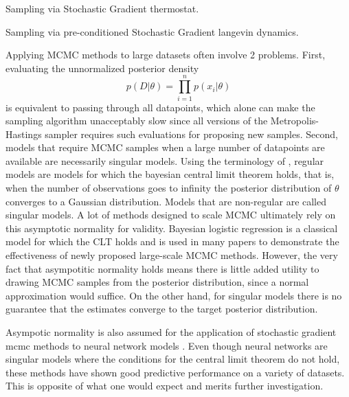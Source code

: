 \documentclass{book}
\begin{document}
\begin{enumerate}
Sampling via Stochastic Gradient thermostat. 

Sampling via pre-conditioned Stochastic Gradient langevin dynamics. 

Applying MCMC methods to large datasets often involve 2 problems. First, evaluating the unnormalized posterior density
\[ p(D|\theta) = \prod_{i=1}^n p(x_i|\theta) \]
 is equivalent to passing through all datapoints, which alone can make the sampling algorithm unacceptably slow since all versions of the Metropolis-Hastings sampler requires such evaluations for proposing new samples. Second, models that require MCMC samples when a large number of datapoints are available are necessarily singular models. Using the terminology of \cite{watanabe2009algebraic}, regular models are models for which the bayesian central limit theorem \cite{le2012asymptotic} holds, that is, when the number of observations goes to infinity the posterior distribution of $\theta$ converges to a Gaussian distribution. Models that are non-regular are called singular models. A lot of methods designed to scale MCMC \cite{neiswanger2013asymptotically,scott2016bayes,} ultimately rely on this asymptotic normality for validity. Bayesian logistic regression is a classical model for which the CLT holds and is used in many papers to demonstrate the effectiveness of newly proposed large-scale MCMC methods. However, the very fact that asympotitic normality holds means there is little added utility to drawing MCMC samples from the posterior distribution, since a normal approximation would suffice. On the other hand, for singular models there is no guarantee that the estimates converge to the target posterior distribution. 

Asympotic normality is also assumed for the application of stochastic gradient mcmc methods to neural network models \cite{welling2011bayesian,chen2014stochastic,ahn2012bayesian,ding2014bayesian,ma2015complete}. Even though neural networks are singular models where the conditions for the central limit theorem do not hold, these methods have shown good predictive performance on a variety of datasets. This is opposite of what one would expect and merits further investigation.


\end{enumerate}
\end{document}
